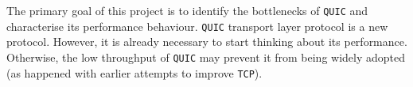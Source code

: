 \documentclass[12pt,a4paper]{report}
\begin{document}
The primary goal of this project is to identify the bottlenecks of \texttt{QUIC} and characterise its performance behaviour.
\texttt{QUIC} transport layer protocol is a new protocol.
However, it is already necessary to start thinking about its performance.
Otherwise, the low throughput of \texttt{QUIC} may prevent it from being widely adopted (as happened with earlier attempts to improve \texttt{TCP}). 










 
 
 
\end{document}

